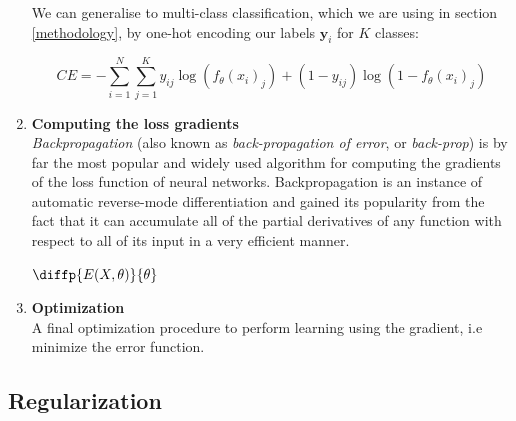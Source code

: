 \documentclass[bsc,frontabs,twoside,singlespacing,parskip,deptreport]{infthesis}     %
\let\Oldsubsection\subsection
\renewcommand{\subsection}{\FloatBarrier\Oldsubsection}
\begin{document}
\begin{enumerate}
We can generalise to multi-class classification, which we are using in section \ref{methodology}, by one-hot encoding our labels \(\mathbf{y}_{i}\) for \(K\) classes:

\begin{equation}
   CE = -\sum_{i=1}^{N} \sum_{j=1}^{K} y_{i j} \log \left(f_{\theta}\left(x_{i}\right)_{j}\right)+\left(1-y_{i j}\right) \log \left(1-f_{\theta}\left(x_{i}\right)_{j}\right)
\end{equation}

    
    \item{ \bf{Computing the loss gradients} } \\
    \textit{Backpropagation} (also known as \textit{back-propagation of error}, or \textit{back-prop}) \cite{rumelhart_learning_1986} is by far the most popular and widely used algorithm for computing the gradients of the loss function of neural networks. Backpropagation is an instance of automatic reverse-mode differentiation and gained its popularity from the fact that it can accumulate all of the partial derivatives of any function with respect to all of its input in a very efficient manner. 
    
     \(\diffp{E(X,\theta)}{\theta}\)
    \item{ \bf{Optimization} } \\ 
    A final optimization procedure to perform learning using the gradient, i.e minimize the error function.
\end{enumerate}

  



\subsection{Regularization}
\end{document}
